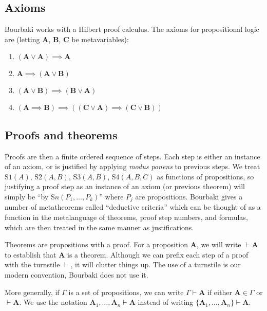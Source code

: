 \documentclass{amsart}%
\newcommand\metavariable[1]{\boldsymbol{#1}}
\begin{document}
\subsection{Axioms}
Bourbaki works with a Hilbert proof calculus. The axioms for
propositional logic are (letting $\metavariable{A}$, $\metavariable{B}$, $\metavariable{C}$ be metavariables):
\begin{enumerate}[label=(S\arabic*),ref={S\arabic*}]
\item\label{axiom:s1} $(\metavariable{A}\lor\metavariable{A})\implies\metavariable{A}$
\item\label{axiom:s2} $\metavariable{A}\implies(\metavariable{A}\lor\metavariable{B})$
\item\label{axiom:s3} $(\metavariable{A}\lor\metavariable{B})\implies(\metavariable{B}\lor\metavariable{A})$
\item\label{axiom:s4} $(\metavariable{A}\implies\metavariable{B})\implies((\metavariable{C}\lor\metavariable{A})\implies(\metavariable{C}\lor\metavariable{B}))$
\end{enumerate}

\subsection{Proofs and theorems}
Proofs are then a finite ordered sequence of steps. Each step is either
an instance of an axiom, or is justified by applying \textit{modus ponens}
to previous steps. We treat S$1(A)$, S$2(A,B)$, S$3(A,B)$, S$4(A,B,C)$
as functions of propositions, so justifying a proof step as an instance
of an axiom (or previous theorem) will simply be ``by S$n(P_{1},\dots,P_{k})$''
where $P_{j}$ are propositions. Bourbaki gives a number of metatheorems
called ``deductive criteria'' which can be thought of as a function in
the metalanguage of theorems, proof step numbers, and formulas,
which are then treated in the same manner as justifications.

Theorems are propositions with a proof. For a proposition
$\metavariable{A}$, we will write $\vdash\metavariable{A}$ to establish
that $\metavariable{A}$ is a theorem. Although we can prefix each step
of a proof with the turnstile $\vdash$, it will clutter things up.
The use of a turnstile is our modern convention, Bourbaki does not use
it.

More generally, if $\Gamma$ is a set of propositions, we can write
$\Gamma\vdash\metavariable{A}$ if either $\metavariable{A}\in\Gamma$ or
$\vdash\metavariable{A}$. We use the notation
$\metavariable{A}_{1},\dots,\metavariable{A}_{n}\vdash\metavariable{A}$
instead of writing $\{\metavariable{A}_{1},\dots,\metavariable{A}_{n}\}\vdash\metavariable{A}$.
\end{document}
